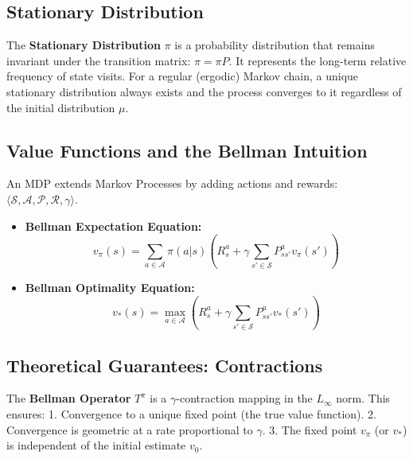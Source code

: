 \subsection{Stationary Distribution}
The \textbf{Stationary Distribution} $\pi$ is a probability distribution that remains invariant under the transition matrix: $\pi = \pi P$. It represents the long-term relative frequency of state visits. For a regular (ergodic) Markov chain, a unique stationary distribution always exists and the process converges to it regardless of the initial distribution $\mu$.

\subsection{Value Functions and the Bellman Intuition}
An MDP extends Markov Processes by adding actions and rewards: $\langle \mathcal{S}, \mathcal{A}, \mathcal{P}, \mathcal{R}, \gamma \rangle$.
\begin{itemize}
    \item \textbf{Bellman Expectation Equation:} 
    \[ v_\pi(s) = \sum_{a \in \mathcal{A}} \pi(a|s) \left( R_s^a + \gamma \sum_{s' \in \mathcal{S}} P_{ss'}^a v_\pi(s') \right) \]
    \item \textbf{Bellman Optimality Equation:} 
    \[ v_*(s) = \max_{a \in \mathcal{A}} \left( R_s^a + \gamma \sum_{s' \in \mathcal{S}} P_{ss'}^a v_*(s') \right) \]
\end{itemize}

\subsection{Theoretical Guarantees: Contractions}
The \textbf{Bellman Operator} $T^\pi$ is a $\gamma$-contraction mapping in the $L_\infty$ norm. This ensures:
1. Convergence to a unique fixed point (the true value function).
2. Convergence is geometric at a rate proportional to $\gamma$.
3. The fixed point $v_\pi$ (or $v_*$) is independent of the initial estimate $v_0$.
